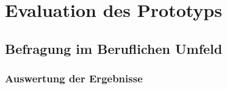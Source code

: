 \chapter{Evaluation des Prototyps}
\section{Befragung im Beruflichen Umfeld}
\subsection{Auswertung der Ergebnisse}